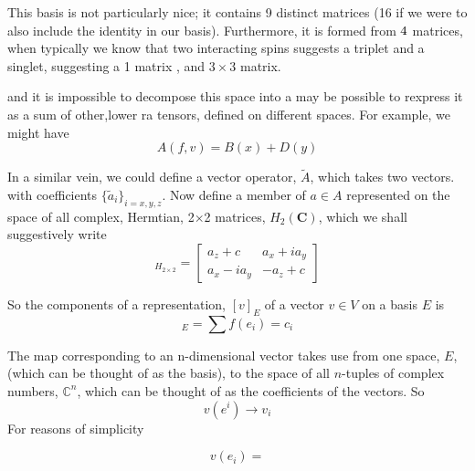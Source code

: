 \documentclass[12pt]{article}
\begin{document}
\noindent This basis is not particularly nice; it contains 9 distinct matrices (16 if we
were to also include the identity in our basis). Furthermore,
it is formed from $4\time4$ matrices, when typically we know that two interacting spins 
suggests a triplet and a singlet, suggesting a 1 matrix , and $3\times3$ matrix.






and it is impossible to decompose this space into a 
may be possible to rexpress it as a sum of other,lower ra tensors, defined on different spaces. For example,
we might have 
\begin{equation}
A(f,v) = B(x) + D(y)
\end{equation}
 

\noindent In a similar vein, we could define a vector operator, $\tilde{A}$, which
takes two vectors. 
 with coefficients $\{\tilde{a}_{i}\}_{i=x,y,z}$. Now define a member of $a\in A$ represented
on the space of all complex, Hermtian, 2$\times$2 matrices, $H_{2}(\mathbf{C})$, which we shall
suggestively write
\begin{equation}
[a]_{H_{2\times 2}} = 
\begin{bmatrix}
a_{z} + c     & a_{x}+ia_{y} \\ 
a_{x}-ia_{y}  & -a_{z} +c
\end{bmatrix}
\end{equation}
 
\noindent So the components of a representation, $[v]_{E}$ of a vector $v\in V$  on a basis $E$ is 
\begin{equation}
[v]_{E} = \sum f(e_{i}) = c_{i}
\end{equation}

\noindent The map corresponding to an n-dimensional vector takes use from one space, $E$, (which can
be thought of as the basis), to the space of all $n$-tuples of complex numbers, $\mathbb{C}^{n}$,
which can be thought of as the coefficients of the vectors.
So
\begin{equation}
v(e^{i}) \rightarrow v_{i}
\end{equation}
For reasons of simplicity 

\begin{equation}
v(e_{i}) = 
\end{equation}
\end{document}
